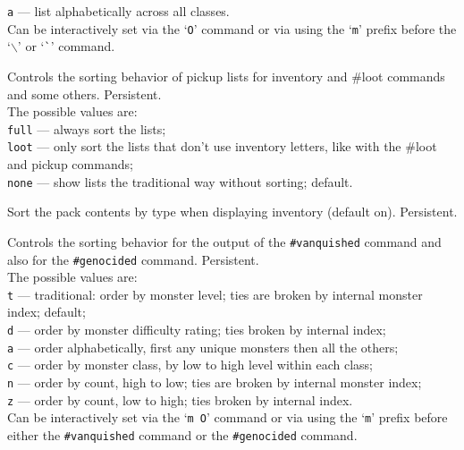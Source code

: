 {\tt a} --- list alphabetically across all classes.\\
Can be interactively set via the `{\tt O}' command or via using
the `{\tt m}' prefix before the `{\tt $\backslash$}'
or `{\tt \`{}}' command.
\item[\ib{sortloot}]
Controls the sorting behavior of pickup lists for inventory
and \#loot commands and some others.  Persistent.
\\
The possible values are:
\\
{\tt full} --- always sort the lists;\\
{\tt loot} --- only sort the lists that don't use inventory
       letters, like with the \#loot and pickup commands;\\
{\tt none} --- show lists the traditional way without sorting; default.
\item[\ib{sortpack}]
Sort the pack contents by type when displaying inventory (default on).
Persistent.
\item[\tb{sortvanquished}]
Controls the sorting behavior for the output of the {\tt \#vanquished} command
and also for the {\tt \#genocided} command.
Persistent.
\\
The possible values are:
\\
{\tt t} ---
traditional: order by monster level; ties are broken by internal
monster index;
default;
\\
{\tt d} ---
order by monster difficulty rating; ties broken by internal index;
\\
{\tt a} ---
order alphabetically, first any unique monsters then all the others;
\\
{\tt c} ---
order by monster class, by low to high level within each class;
\\
{\tt n} ---
order by count, high to low; ties are broken by internal monster index;
\\
{\tt z} ---
order by count, low to high; ties broken by internal index.
\\
Can be interactively set via the `{\tt m O}' command or via using
the `{\tt m}' prefix before either the {\tt \#vanquished} command
or the {\tt \#genocided} command.
\item[\ib{sounds}]
